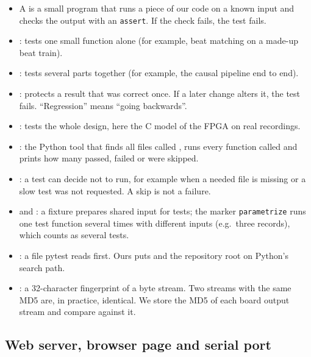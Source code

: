 \documentclass[11pt]{article}
\renewcommand{\file}[1]{\path{#1}}
\begin{document}
\begin{itemize}
  \item A  is a small program that runs a piece of our code on a known input and checks the output with an \texttt{assert}. If the check fails, the test fails.
  \item {}: tests one small function alone (for example, beat matching on a made-up beat train).
  \item {}: tests several parts together (for example, the causal pipeline end to end).
  \item {}: protects a result that was correct once. If a later change alters it, the test fails. ``Regression'' means ``going backwards''.
  \item {}: tests the whole design, here the C model of the FPGA on real recordings.
  \item {}: the Python tool that finds all files called \file{test_*.py}, runs every function called \file{test_*} and prints how many passed, failed or were skipped.
  \item {}: a test can decide not to run, for example when a needed file is missing or a slow test was not requested. A skip is not a failure.
  \item {} and : a fixture prepares shared input for tests; the marker \texttt{parametrize} runs one test function several times with different inputs (e.g.\ three records), which counts as several tests.
  \item {}: a file pytest reads first. Ours puts \file{src/} and the repository root on Python's search path.
  \item {}: a 32-character fingerprint of a byte stream. Two streams with the same MD5 are, in practice, identical. We store the MD5 of each board output stream and compare against it.
\end{itemize}

\subsection{Web server, browser page and serial port}
\end{document}
